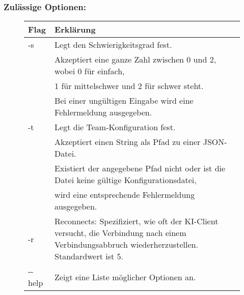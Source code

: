 \subsubsection{Zulässige Optionen:}
\begin{figure}[H]
    \centering
    \begin{tabular}{|p{2cm}|p{12cm} |}
        \hline
        Flag & Erklärung \\\hline
        -s & Legt den Schwierigkeitsgrad fest.\\
        & Akzeptiert eine ganze Zahl zwischen 0 und 2, wobei 0 für einfach,\\
        & 1 für mittelschwer und 2 für schwer steht.\\
        & Bei einer ungültigen Eingabe wird eine Fehlermeldung ausgegeben.\\\hline
        -t & Legt die Team-Konfiguration fest.\\
        & Akzeptiert einen String als Pfad zu einer JSON-Datei.\\
        & Existiert der angegebene Pfad nicht oder ist die Datei keine gültige Konfigurationsdatei,\\
        & wird eine entsprechende Fehlermeldung ausgegeben.\\\hline
		-r & Reconnects: Spezifiziert, wie oft der KI-Client versucht, die Verbindung nach einem Verbindungsabbruch 
		wiederherzustellen. Standardwert ist 5.\\\hline
        -{}-help & Zeigt eine Liste möglicher Optionen an.\\\hline
    \end{tabular}
\end{figure}
